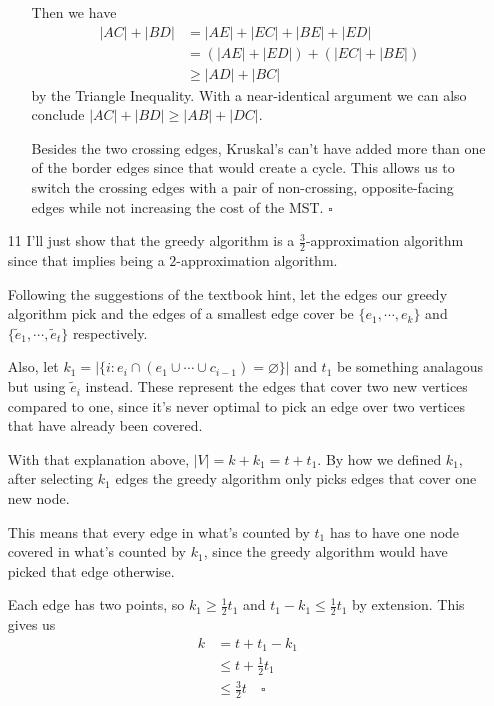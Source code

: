 \documentclass[12pt]{article}
\begin{document}
\begin{enumerate}
\begin{enumerate}
                  Then we have
                  \begin{align*}
                      |AC|+|BD|
                       & = |AE|+|EC|+|BE|+|ED|     \\
                       & = (|AE|+|ED|)+(|EC|+|BE|) \\
                       & \ge |AD|+|BC|
                  \end{align*}
                  by the Triangle Inequality.
                  With a near-identical argument we can also conclude $|AC|+|BD| \ge |AB|+|DC|$.

                  Besides the two crossing edges, Kruskal's can't have added
                  more than one of the border edges since that would create a cycle.
                  This allows us to switch the crossing edges with a pair
                  of non-crossing, opposite-facing edges while not increasing the cost of the MST. $\square$
        \end{enumerate}

        \pagebreak

    \item[11] I'll just show that the greedy algorithm is a $\frac{3}{2}$-approximation
        algorithm since that implies being a $2$-approximation algorithm.

        Following the suggestions of the textbook hint, let
        the edges our greedy algorithm pick and the edges of a smallest edge cover be
        $\{e_1, \cdots, e_k\} $ and $\{\tilde{e}_1, \cdots, \tilde{e}_t\} $ respectively.

        Also, let $k_1 = |\{i : e_i \cap (e_1 \cup \cdots \cup c_{i-1}) = \varnothing\}|$
        and $t_1$ be something analagous but using $\tilde{e}_i$ instead.
        These represent the edges that cover two new vertices compared to one,
        since it's never optimal to pick an edge over two vertices that
        have already been covered.

        With that explanation above, $|V|=k+k_1=t+t_1$.
        By how we defined $k_1$, after selecting $k_1$ edges
        the greedy algorithm only picks edges that cover one new node.

        This means that every edge in what's counted by $t_1$
        has to have one node covered in what's counted by $k_1$,
        since the greedy algorithm would have picked that edge otherwise.

        Each edge has two points, so $k_1 \ge \frac{1}{2}t_1$ and $t_1-k_1 \le \frac{1}{2}t_1$ by extension.
        This gives us
        \begin{align*}
            k
             & = t+t_1-k_1                  \\
             & \le t+\frac{1}{2}t_1         \\
             & \le \frac{3}{2}t\quad\square
        \end{align*}
\end{enumerate}
\end{document}
